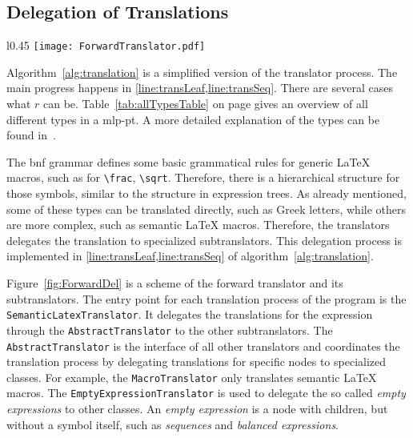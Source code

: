 \subsection{Delegation of Translations}\label{subsec:delegation}

\begin{wrapfigure}{l}{0.45\textwidth}
	\vspace{-20pt}
	\centering
	\texttt{[image: ForwardTranslator.pdf]}
	\caption{A scheme of the forward translator and its specialized subtranslators.}
	\label{fig:ForwardDel}
	\vspace{-25pt}
\end{wrapfigure}

Algorithm~\ref{alg:translation} is a simplified version of the translator process. The main progress happens in \cref{line:transLeaf,line:transSeq}. There are several cases what $r$ can be. Table~\ref{tab:allTypesTable} on page \pageref{tab:allTypesTable} gives an overview of all different types in a \gls{mlp-pt}. A more detailed explanation of the types can be found in~\parencite{POM-Tagger}. 

The \gls{bnf} grammar defines some basic grammatical rules for generic \LaTeX{} macros, such as for \verb|\frac|, \verb|\sqrt|. Therefore, there is a hierarchical structure for those symbols, similar to the structure in expression trees. As already mentioned, some of these types can be translated directly, such as Greek letters, while others are more complex, such as semantic \LaTeX{} macros. Therefore, the translators delegates the translation to specialized subtranslators. This delegation process is implemented in \cref{line:transLeaf,line:transSeq} of algorithm~\ref{alg:translation}.

Figure~\ref{fig:ForwardDel} is a scheme of the forward translator and its subtranslators. The entry point for each translation process of the program is the \verb|SemanticLatexTranslator|. It delegates the translations for the expression through the \verb|AbstractTranslator| to the other subtranslators. The \verb|AbstractTranslator| is the interface of all other translators and coordinates the translation process by delegating translations for specific nodes to specialized classes. For example, the \verb|MacroTranslator| only translates semantic \LaTeX{} macros. The \verb|EmptyExpressionTranslator| is used to delegate the so called \textit{empty expressions} to other classes. An \textit{empty expression} is a node with children, but without a symbol itself, such as \textit{sequences} and \textit{balanced expressions}.

